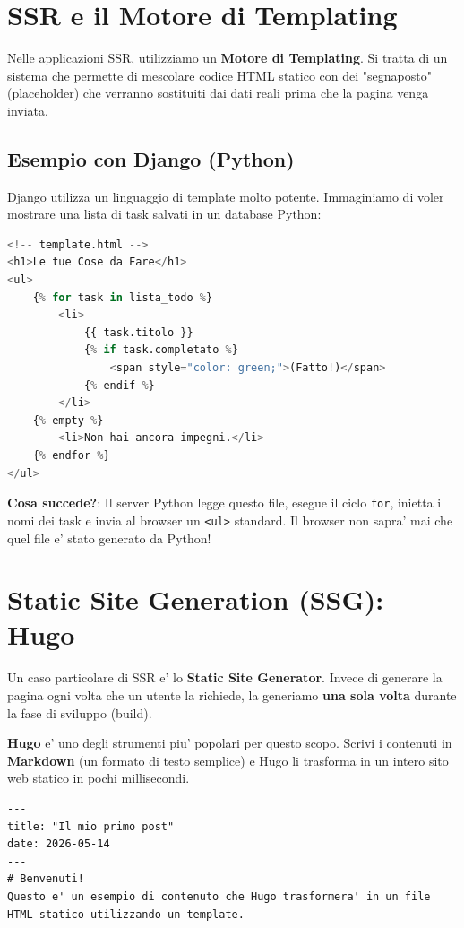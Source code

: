 \documentclass[11pt,a4paper]{report}
\begin{document}
\section{SSR e il Motore di Templating}
Nelle applicazioni SSR, utilizziamo un \textbf{Motore di Templating}. Si tratta di un sistema che permette di mescolare codice HTML statico con dei "segnaposto" (placeholder) che verranno sostituiti dai dati reali prima che la pagina venga inviata.

\subsection{Esempio con Django (Python)}
Django utilizza un linguaggio di template molto potente. Immaginiamo di voler mostrare una lista di task salvati in un database Python:

\begin{lstlisting}[language=Python, caption=Esempio di Template Django]
<!-- template.html -->
<h1>Le tue Cose da Fare</h1>
<ul>
    {% for task in lista_todo %}
        <li>
            {{ task.titolo }} 
            {% if task.completato %}
                <span style="color: green;">(Fatto!)</span>
            {% endif %}
        </li>
    {% empty %}
        <li>Non hai ancora impegni.</li>
    {% endfor %}
</ul>
\end{lstlisting}

\textbf{Cosa succede?}: Il server Python legge questo file, esegue il ciclo \texttt{for}, inietta i nomi dei task e invia al browser un \texttt{<ul>} standard. Il browser non sapra' mai che quel file e' stato generato da Python!

\section{Static Site Generation (SSG): Hugo}
Un caso particolare di SSR e' lo \textbf{Static Site Generator}. Invece di generare la pagina ogni volta che un utente la richiede, la generiamo \textbf{una sola volta} durante la fase di sviluppo (build).

\textbf{Hugo} e' uno degli strumenti piu' popolari per questo scopo. Scrivi i contenuti in \textbf{Markdown} (un formato di testo semplice) e Hugo li trasforma in un intero sito web statico in pochi millisecondi.

\begin{lstlisting}[caption=Esempio di contenuto Hugo (Markdown)]
---
title: "Il mio primo post"
date: 2026-05-14
---
# Benvenuti!
Questo e' un esempio di contenuto che Hugo trasformera' in un file HTML statico utilizzando un template.
\end{lstlisting}
\end{document}
